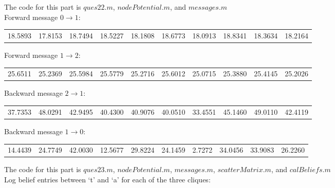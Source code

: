 \documentclass[11pt]{article}
\begin{document}
\begin{problem}{40}
The code for this part is $ques22.m$, $nodePotential.m$, and $messages.m$\\
Forward message $0 \to 1$:
\begin{center}
\begin{tabular}{r|r|r|r|r|r|r|r|r|r}
18.5893 &  17.8153  & 18.7494  & 18.5227  & 18.1808  & 18.6773  & 18.0913  & 18.8341  & 18.3634  & 18.2164
\end{tabular}\end{center}
Forward message $1 \to 2$:
\begin{center}
\begin{tabular}{r|r|r|r|r|r|r|r|r|r}
25.6511 &  25.2369 &  25.5984 &  25.5779  & 25.2716 &  25.6012 &  25.0715  & 25.3880  & 25.4145 &  25.2026
\end{tabular}\end{center}
Backward message $2 \to 1$:
\begin{center}
\begin{tabular}{r|r|r|r|r|r|r|r|r|r}
37.7353  & 48.0291  & 42.9495  & 40.4300&   40.9076  & 40.0510 &  33.4551&   45.1460  & 49.0110  & 42.4119
\end{tabular}\end{center}
Backward message $1 \to 0$:
\begin{center}
\begin{tabular}{r|r|r|r|r|r|r|r|r|r}
14.4439 &  24.7749 &  42.0030 &  12.5677  & 29.8224  & 24.1459   & 2.7272  & 34.0456 &  33.9083  & 26.2260
\end{tabular}\end{center}

The code for this part is $ques23.m$, $nodePotential.m$, $messages.m$,  $scatterMatrix.m$, and $calBeliefs.m$\\
Log belief entries between `t' and `a' for each of the three cliques:


\end{problem}
\end{document}
